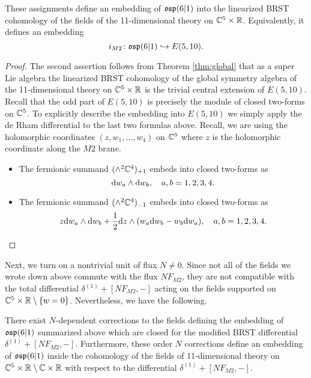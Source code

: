 \begin{lem}\label{lem:m2emb}
These assignments define an embedding of $\mathfrak{osp}(6|1)$ into the linearized BRST cohomology of the fields of the 11-dimensional theory on $\mathbb C^5 \times \mathbb R$. 
Equivalently, it defines an embedding
\[
i_{M2} \colon \mathfrak{osp}(6|1) \hookrightarrow E(5,10) .
\]
\end{lem} 
\begin{proof}
The second assertion follows from Theorem \ref{thm:global} that as a super Lie algebra the linearized BRST cohomology of the global symmetry algebra of the 11-dimensional theory on $\mathbb C^5 \times \mathbb R$ is the trivial central extension of $E(5,10)$. 
Recall that the odd part of $E(5,10)$ is precisely the module of closed two-forms on $\mathbb C^5$. 
To explicitly describe the embedding into $E(5,10)$ we simply apply the de Rham differential to the last two formulas above.
Recall, we are using the holomorphic coordinates $(z,w_1,\ldots,w_4)$ on $\mathbb C^5$ where $z$ is the holomorphic coordinate along the $M2$ brane. 
\begin{itemize}
\item 
The fermionic summand $(\wedge^2 \mathbb C^4)_{+1}$ embeds into closed two-forms as
\[
{\rm d} w_a \wedge {\rm d} w_b, \quad a,b=1,2,3,4. 
\] 
\item The fermionic summand $(\wedge^2 \mathbb C^4)_{-1}$ embeds into closed two-forms as
\[
z {\rm d} w_a  \wedge {\rm d} w_b + \frac12 {\rm d} z \wedge (w_a {\rm d} w_b - w_b {\rm d} w_a) , \quad a,b=1,2,3,4. 
\] 
\end{itemize}
\end{proof}
\parsec[]

Next, we turn on a nontrivial unit of flux $N \ne 0$. 
Since not all of the fields we wrote down above commute with the flux $N F_{M2}$, they are not compatible with the total differential $\delta^{(1)} + [N F_{M2}, -]$ acting on the fields supported on $\mathbb C^5 \times \mathbb R \setminus \{w=0\}$. 
Nevertheless, we have the following. 

\begin{prop}
\label{prop:brads4}
There exist $N$-dependent corrections to the fields defining the embedding of $\mathfrak{osp}(6|1)$ summarized above which are closed for the modified BRST differential $\delta^{(1)} + [N F_{M2},-]$. 
Furthermore, these order $N$ corrections define an embedding of $\mathfrak{osp}(6|1)$ inside the cohomology of the fields of 11-dimensional theory on $\mathbb C^5 \times \mathbb R \setminus \mathbb C \times \mathbb R$ with respect to the differential $\delta^{(1)} + [N F_{M2},-]$.
\end{prop}

